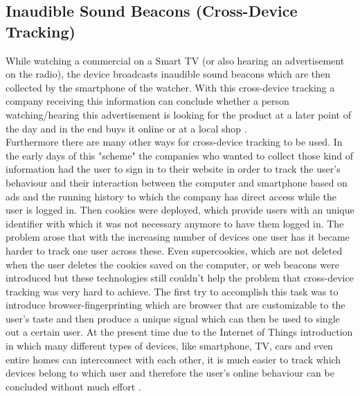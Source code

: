 \documentclass{report}
\begin{document}
		\subsection{Inaudible Sound Beacons (Cross-Device Tracking)}
		\startsubsection
			While watching a commercial on a Smart TV (or also hearing an advertisement on the radio), the device broadcasts inaudible sound beacons which are then collected by the smartphone of the watcher.  With this cross-device tracking a company receiving this information can conclude whether a person watching/hearing this advertisement is looking for the product at a later point of the day and in the end buys it online or at a local shop \cite{PiP}. \\
			Furthermore there are many other ways for cross-device tracking to be used. In the early days of this "scheme" the companies who wanted to collect those kind of information had the user to sign in to their website in order to track the user's behaviour and their interaction between the computer and smartphone based on ads and the running history to which the company has direct access while the user is logged in. Then cookies were deployed, which provide users with an unique identifier with which it was not necessary anymore to have them logged in. The problem arose that with the increasing number of devices one user has it became harder to track one user across these. Even supercookies, which are not deleted when the user deletes the cookies saved on the computer, or web beacons were introduced but these technologies still couldn't help the problem that cross-device tracking was very hard to achieve. The first try to accomplish this task was to introduce browser-fingerprinting which are browser that are customizable to the user's taste and then produce a unique signal which can then be used to single out a certain user. At the present time due to the Internet of Things introduction in which many different types of devices, like smartphone, TV, cars and even entire homes can interconnect with each other, it is much easier to track which devices belong to which user and therefore the user's online behaviour can be concluded without much effort \cite{WCDT}.
		\closesection
	\closesection
	
	{\let\clearpage\relax }
\end{document}
